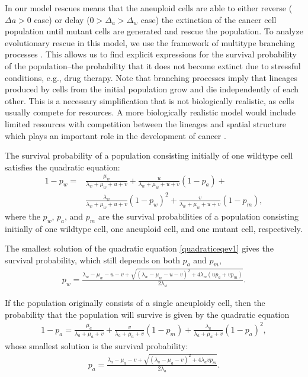 \documentclass[12pt]{extarticle}
\begin{document}
In our model rescues means that the aneuploid cells are able to either reverse ($\Delta a>0$ case) or delay ($0>\Delta_a>\Delta_w$ case) the extinction of the cancer cell population until mutant cells are generated and rescue the population.
To analyze evolutionary rescue in this model, we use the framework of multitype branching processes \cite{rybnikov2021fitness,harris1963theory}. %
This allows us to find explicit expressions for the survival probability of the population--the probability that it does not become extinct due to stressful conditions, e.g., drug therapy.
Note that branching processes imply that lineages produced by cells from the initial population grow and die independently of each other. This is a necessary simplification that is not biologically realistic, as cells usually compete for resources. A more biologically realistic model would include limited resources with competition between the lineages and spatial structure which plays an important role in the development of cancer \cite{martens2011spatial}. %

The survival probability of a population consisting initially of one wildtype cell satisfies the quadratic equation:
\begin{equation} \label{quadraticeqev1}
\begin{aligned}
1-p_w = & \frac{\mu_w}{\lambda_w+\mu_w+u+v} + 
		  \frac{u}{\lambda_w+\mu_w+u+v}\left(1-p_a\right) + \\
		  & \frac{\lambda_w}{\lambda_w+\mu_w+u+v}\left(1-p_w\right)^2 +
		  \frac{v}{\lambda_w+\mu_w+u+v}\left(1-p_m\right) ,
\end{aligned}
\end{equation}
where the $p_w$, $p_a$, and $p_m$ are the survival probabilities of a population consisting initially of one wildtype cell, one aneuploid cell, and one mutant cell, respectively.

The smallest solution of the quadratic equation \cref{quadraticeqev1} gives the survival probability, which still depends on both $p_a$ and $p_m$,
\begin{align}\label{survprobw}
p_w=\frac{\lambda_w-\mu_w-u-v+\sqrt{\left(\lambda_w-\mu_w-u-v\right)^2+4\lambda_w\left(up_a+vp_m\right)}}{2\lambda_w} .
\end{align}

If the population originally consists of a single aneuploidy cell, then the probability that the population will survive is given by the quadratic equation
\begin{align}
1-p_a=\frac{\mu_a}{\lambda_a+\mu_a+v}+\frac{v}{\lambda_a+\mu_a+v}\left(1-p_m\right)+\frac{\lambda_a}{\lambda_a+\mu_a+v}\left(1-p_a\right)^2,
\end{align}
whose smallest solution is the survival probability:
\begin{align}\label{survproba}
p_a=\frac{\lambda_a-\mu_a-v+\sqrt{\left(\lambda_a-\mu_a-v\right)^2+4\lambda_avp_m}}{2\lambda_a}.
\end{align}
\end{document}

